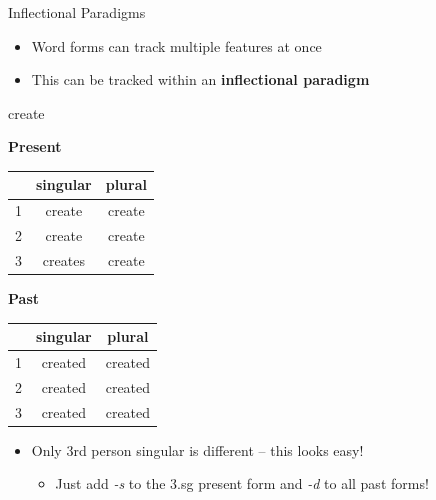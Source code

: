 \documentclass[10pt, compress]{beamer}
\begin{document}
\begin{frame}{Inflectional Paradigms}
	\begin{itemize}
		\item Word forms can track multiple features at once
		\item This can be tracked within an \bf{inflectional paradigm}
	\end{itemize}

	\begin{table}
		{\sc create} \\
		\begin{multicols}{2}

			{\bf Present}	\\
			\begin{tabular}{|r|cc|}
				\toprule
					&	singular	&	plural	\\
				\midrule
				1	&	create 	&	create 	\\	
				2	&	create 	&	create 	\\
				3	&	creates &	create 	\\
				\bottomrule
			\end{tabular}

			{\bf Past}	\\
			\begin{tabular}{|r|cc|}
				\toprule
					&	singular	&	plural	\\
				\midrule
				1	&	created 	&	created 	\\	
				2	&	created 	&	created 	\\
				3	&	created &	created 	\\
				\bottomrule
			\end{tabular}
		\end{multicols}
	\end{table}
	\pause
	\begin{itemize}
		\item Only 3rd person singular is different -- this looks easy!
		\begin{itemize}
			\item Just add \emph{-s} to the 3.sg present form and \emph{-d} to all past forms!
		\end{itemize}
	\end{itemize}
\end{frame}
\end{document}
